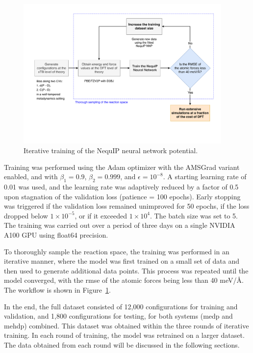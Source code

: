 \begin{figure}[t!]
    \centering
    \includegraphics[width=0.95\textwidth]{Figures/3_Computational_details/methods_workflow_diagram.pdf}
    \caption{Iterative training of the NequIP neural network potential.}
    \label{fig:iterative-training}
\end{figure}

Training was performed using the Adam optimizer with the AMSGrad variant enabled, and with $\beta_1 = 0.9$, $\beta_2 = 0.999$, and $\epsilon = 10^{-8}$. A starting learning rate of 0.01 was used, and the learning rate was adaptively reduced by a factor of 0.5 upon stagnation of the validation loss (patience = 100 epochs). Early stopping was triggered if the validation loss remained unimproved for 50 epochs, if the loss dropped below $1 \times 10^{-5}$, or if it exceeded $1 \times 10^{4}$. The batch size was set to 5. The training was carried out over a period of three days on a single NVIDIA A100 GPU using float64 precision.

To thoroughly sample the reaction space, the training was performed in an iterative manner, where the model was first trained on a small set of data and then used to generate additional data points. This process was repeated until the model converged, with the \ac{rmse} of the atomic forces being less than 40 meV/\AA. The workflow is shown in Figure~\ref{fig:iterative-training}.

In the end, the full dataset consisted of 12,000 configurations for training and validation, and 1,800 configurations for testing, for both systems (\ac{medp} and \ac{mehdp}) combined. This dataset was obtained within the three rounds of iterative training. In each round of training, the model was retrained on a larger dataset. The data obtained from each round will be discussed in the following sections.



